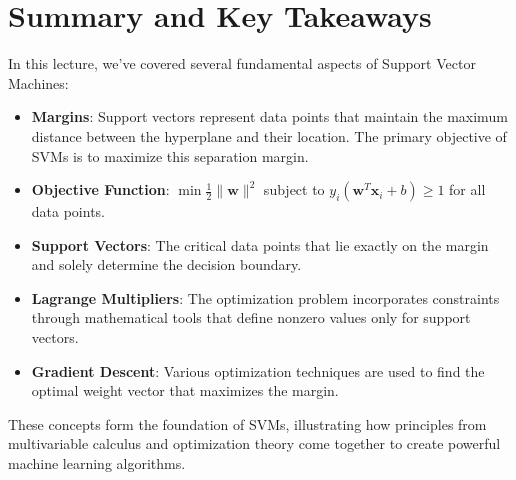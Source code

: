 \section{Summary and Key Takeaways}

In this lecture, we've covered several fundamental aspects of Support Vector Machines:

\begin{itemize}
    \item \textbf{Margins}: Support vectors represent data points that maintain the maximum distance between the hyperplane and their location. The primary objective of SVMs is to maximize this separation margin.
    
    \item \textbf{Objective Function}: $\min \frac{1}{2} \|\mathbf{w}\|^2$ subject to $y_i(\mathbf{w}^T\mathbf{x}_i + b) \geq 1$ for all data points.
    
    \item \textbf{Support Vectors}: The critical data points that lie exactly on the margin and solely determine the decision boundary.
    
    \item \textbf{Lagrange Multipliers}: The optimization problem incorporates constraints through mathematical tools that define nonzero values only for support vectors.
    
    \item \textbf{Gradient Descent}: Various optimization techniques are used to find the optimal weight vector that maximizes the margin.
\end{itemize}

These concepts form the foundation of SVMs, illustrating how principles from multivariable calculus and optimization theory come together to create powerful machine learning algorithms.
